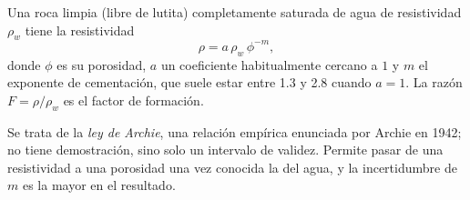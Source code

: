 \begin{proposition}\label{prop:b3:field-lab-methods-3:archie}
Una roca limpia (libre de lutita) completamente saturada de agua de
resistividad $\rho_w$ tiene la resistividad
\[
\rho = a\,\rho_w\,\phi^{-m} ,
\]
donde $\phi$ es su porosidad, $a$ un coeficiente habitualmente cercano a $1$
y $m$ el exponente de cementación, que suele estar entre \num{1.3} y
\num{2.8} cuando $a = 1$. La razón $F = \rho/\rho_w$ es el factor de
formación.
\end{proposition}
Se trata de la \emph{ley de Archie}, una relación
empírica enunciada por Archie en 1942; no tiene demostración, sino solo un intervalo de validez. Permite pasar de una resistividad a una porosidad una vez
conocida la del agua, y la incertidumbre de $m$ es la mayor en el resultado.

